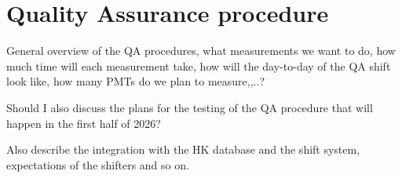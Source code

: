 \documentclass[12pt,a4paper]{article}
\begin{document}
\section{Quality Assurance procedure}\label{secQAProcedure}

General overview of the QA procedures, what measurements we want to do, how much time will each measurement take, how will the day-to-day of the QA shift look like, how many PMTs do we plan to measure,,..?

Should I also discuss the plans for the testing of the QA procedure that will happen in the first half of 2026?

Also describe the integration with the HK database and the shift system, expectations of the shifters and so on.
\end{document}
